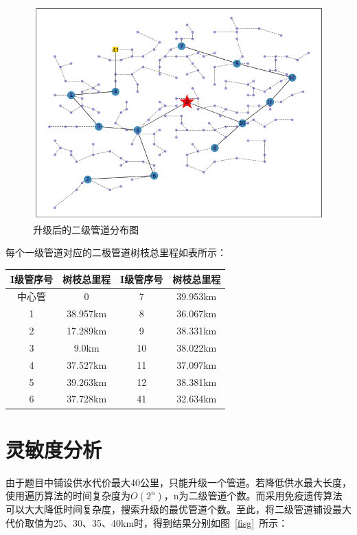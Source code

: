 \documentclass{whutmod}
\begin{document}
  	\begin{figure}[H]
  		\centering
  		\includegraphics[width=\textwidth]{figures/ssss.png}
  		\caption{升级后的二级管道分布图}\label{glsssd}
  	\end{figure}
  \newpage
  每个一级管道对应的二极管道树枝总里程如表所示：
  			\begin{table}[H]
  		\centering
  		\begin{tabular}{cccc}
  			\toprule[1.5pt]
  			\multicolumn{1}{m{3cm}}{\centering I级管序号} & \multicolumn{1}{m{3cm}}{\centering 树枝总里程} &
  			\multicolumn{1}{m{3cm}}{\centering I级管序号} &
  			\multicolumn{1}{m{3cm}}{\centering 树枝总里程} \\
  			\midrule[0.5pt]		
  			中心管 & 0 &7&39.953km \\ 
  			1  & 38.957km &8& 36.067km\\ 
  			2  & 17.289km &9& 38.331km\\ 
  		  	3  & 9.0km &10& 38.022km\\ 
  		  	4 & 37.527km &11&37.097km \\ 
  		  	5  & 39.263km &12& 38.381km\\ 
  		  	6  & 37.728km &41& 32.634km\\ 
  			\bottomrule[1.5pt]
  		\end{tabular}
  	\end{table}
  	
  	\section{灵敏度分析}
 	由于题目中铺设供水代价最大40公里，只能升级一个管道。若降低供水最大长度，使用遍历算法的时间复杂度为$O(2^n)$，n为二级管道个数。而采用免疫遗传算法可以大大降低时间复杂度，搜索升级的最优管道个数。至此，将二级管道铺设最大代价取值为25、30、35、40km时，得到结果分别如图~\ref{fisg}~所示：
 	
\end{document}

